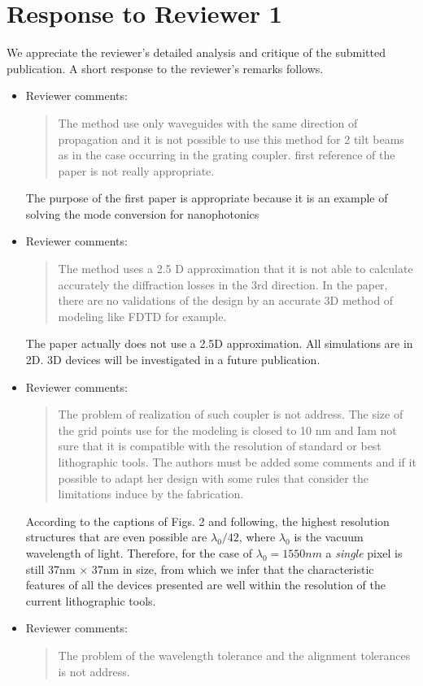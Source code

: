 \documentclass{article}
\newcommand{\Q}[1]{\begin{quote} #1 \end{quote}}
\begin{document}
\section*{Response to Reviewer 1}
We appreciate the reviewer's detailed analysis and critique of the submitted
    publication.
A short response to the reviewer's remarks follows.
\begin{itemize}
\item Reviewer comments: 
    \Q{The method use only waveguides with the same direction of propagation and it is not
    possible to use this method for 2 tilt beams as in the case occurring in the grating
    coupler. first reference of the paper is not really appropriate.}

    The purpose of the first paper is appropriate because it is an example of
    solving the mode conversion for nanophotonics

\item Reviewer comments: 
    \Q{The method uses a 2.5 D approximation that it is not able to calculate accurately the
diffraction losses in the 3rd direction. In the paper, there are no validations of the
design by an accurate 3D method of modeling like FDTD for example.}

    The paper actually does not use a 2.5D approximation. 
    All simulations are in 2D. 
    3D devices will be investigated in a future publication.

\item Reviewer comments:
    \Q{The problem of realization of such coupler is not address. The size of the grid points
use for the modeling is closed to 10 nm and Iam not sure that it is compatible with the
resolution of standard or best lithographic tools. The authors must be added some
comments and if it possible to adapt her design with some rules that consider the
limitations induce by the fabrication.}

    According to the captions of Figs. 2 and following, the highest resolution 
    structures that are even possible are $\lambda_0/42$, where $\lambda_0$
    is the vacuum wavelength of light. 
    Therefore, for the case of $\lambda_0 = 1550 nm$ a \emph{single} pixel is 
    still 37nm $\times$ 37nm in size, from which we infer that the
    characteristic features of all the devices presented are well within
    the resolution of the current lithographic tools.

\item Reviewer comments:
    \Q{The problem of the wavelength tolerance and the alignment tolerances is not address.}


\end{itemize}
\end{document}
